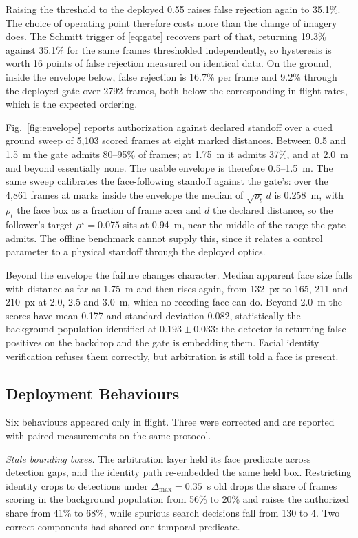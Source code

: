 \documentclass[conference]{IEEEtran}
\begin{document}
Raising the threshold to the deployed 0.55 raises false rejection again to
35.1\%.
The choice of operating point therefore costs more than the change of imagery
does.
The Schmitt trigger of \eqref{eq:gate} recovers part of that, returning 19.3\%
against 35.1\% for the same frames thresholded independently, so hysteresis is
worth 16 points of false rejection measured on identical data.
On the ground, inside the envelope below, false rejection is 16.7\% per frame
and 9.2\% through the deployed gate over 2792 frames, both below the
corresponding in-flight rates, which is the expected ordering.

Fig.~\ref{fig:envelope} reports authorization against declared standoff over a
cued ground sweep of 5{,}103 scored frames at eight marked distances.
Between 0.5 and 1.5~m the gate admits 80--95\% of frames; at 1.75~m it admits
37\%, and at 2.0~m and beyond essentially none.
The usable envelope is therefore 0.5--1.5~m.
The same sweep calibrates the face-following standoff against the gate's: over
the 4{,}861 frames at marks inside the envelope the median of $\sqrt{\rho_t}\,d$ is
0.258~m, with $\rho_t$ the face box as a fraction of frame area and $d$ the
declared distance, so the follower's target $\rho^{\star}=0.075$ sits at 0.94~m,
near the middle of the range the gate admits.
The offline benchmark cannot supply this, since it relates a control parameter
to a physical standoff through the deployed optics.

Beyond the envelope the failure changes character.
Median apparent face size falls with distance as far as 1.75~m and then rises
again, from 132~px to 165, 211 and 210~px at 2.0, 2.5 and 3.0~m, which no
receding face can do.
Beyond 2.0~m the scores have mean 0.177 and standard deviation 0.082,
statistically the background population identified at $0.193\pm0.033$: the
detector is returning false positives on the backdrop and the gate is embedding
them.
Facial identity verification refuses them correctly, but arbitration is still told a face is
present.

\subsection{Deployment Behaviours}
\label{sec:behaviours}

Six behaviours appeared only in flight.
Three were corrected and are reported with paired measurements on the same
protocol.

\emph{Stale bounding boxes.}
The arbitration layer held its face predicate across detection gaps, and the
identity path re-embedded the same held box.
Restricting identity crops to detections under $\Delta_{\max}=0.35$~s old drops
the share of frames scoring in the background population from 56\% to 20\% and
raises the authorized share from 41\% to 68\%, while spurious search decisions
fall from 130 to 4.
Two correct components had shared one temporal predicate.
\end{document}
